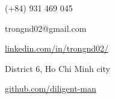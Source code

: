 \documentclass{src/preamble/doc_class}
\begin{document}
	\PrintableMode

	\begin{TopBar}{\ColorTextSide}

        \SimpleSeparator{\ColorHighlight}

        \begin{DoubleColumns}
			\begin{ItemList}{\ColorHighlight}
				\item [\large\faMobile] \hspace{-2.7mm} \large{(+84) 931 469 045}
				\item [\large\faGoogle] \hspace{-3.35mm} \large{trongnd02@gmail.com}
                \item [\large\faLinkedinSquare] \hspace{-2.9mm} \large{\href{https://www.linkedin.com/in/trongnd02/}{linkedin.com/in/trongnd02/}}
			\end{ItemList}
			\nextcolumn
			\begin{ItemList}{\ColorHighlight}
    			\item [\large\faHome] \hspace{-3.35mm} \large{District 6, Ho Chi Minh city}
	       		\item [\large\faGithub] \hspace{-2mm} \large{\href{https://github.com/diligent-man}{github.com/diligent-man}}
			\end{ItemList}
		\end{DoubleColumns}
	\end{TopBar}
\end{document}
